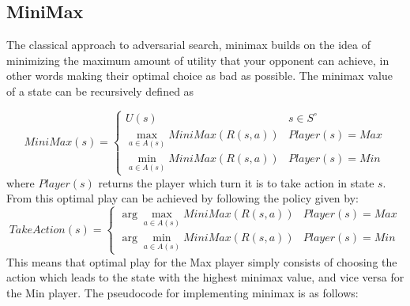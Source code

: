 \subsection{MiniMax}

The classical approach to adversarial search, minimax builds on the
idea of minimizing the maximum amount of utility that your opponent can
achieve, in other words making their optimal choice as bad as possible.
The minimax value of a state can be recursively defined as

\begin{equation}
    MiniMax(s) = \begin{cases}
        U(s) & s \in S^\circ \\
        \max_{a \in A(s)} MiniMax(R(s, a)) & Player(s) = Max \\
        \min_{a \in A(s)} MiniMax(R(s, a)) & Player(s) = Min
    \end{cases}
    \label{eq:minimax}
\end{equation}
where $Player(s)$ returns the player which turn it is to take action in
state $s$. From this optimal play can be achieved by following the policy
given by:
\begin{equation}
    TakeAction(s) = \begin{cases}
        \arg\max_{a \in A(s)} MiniMax(R(s, a)) & Player(s) = Max \\
        \arg\min_{a \in A(s)} MiniMax(R(s, a)) & Player(s) = Min
    \end{cases}
    \label{eq:minimax_policy}
\end{equation}
This means that optimal play for the Max player simply consists of choosing
the action which leads to the state with the highest minimax value, and
vice versa for the Min player. The pseudocode for implementing minimax
is as follows:

